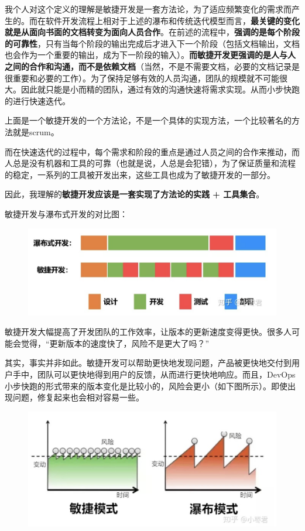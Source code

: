\documentclass[12pt]{article}
\begin{document}
我个人对这个定义的理解是敏捷开发是一套方法论，为了适应频繁变化的需求而产生的。而在软件开发流程上相对于上述的瀑布和传统迭代模型而言，\textbf{最关键的变化就是从面向书面的文档转变为面向人员合作}。在前述的流程中，\textbf{强调的是每个阶段的可靠性}，只有当每个阶段的输出完成后才进入下一个阶段（包括文档输出，文档也会作为一个重要的输出，成为下一阶段的输入）。\textbf{而敏捷开发更强调的是人与人之间的合作和沟通，而不是依赖文档}（当然，不是不需要文档，必要的文档记录是很重要和必要的工作）。为了保持足够有效的人员沟通，团队的规模就不可能很大。因此就只能是小而精的团队，通过有效的沟通快速将需求实现。从而小步快跑的进行快速迭代。

上面是一个敏捷开发的一个方法论，不是一个具体的实现方法，一个比较著名的方法就是scrum。

而在快速迭代的过程中，每个需求和阶段的重点是通过人员之间的合作来推动，而人总是没有机器和工具的可靠（也就是说，人总是会犯错），为了保证质量和流程的稳定，一系列的工具被开发出来，这些工具也成为了敏捷开发的一部分。

因此，我理解的\textbf{敏捷开发应该是一套实现了方法论的实践 + 工具集合}。

敏捷开发与瀑布式开发的对比图：
\begin{figure}[H]
    \centering
    \includegraphics[width=.6\textwidth]{fig/DevOps_Agile_vs_Waterfall_1.png}
\end{figure}

敏捷开发大幅提高了开发团队的工作效率，让版本的更新速度变得更快。很多人可能会觉得，“更新版本的速度快了，风险不是更大了吗？”

其实，事实并非如此。敏捷开发可以帮助更快地发现问题，产品被更快地交付到用户手中，团队可以更快地得到用户的反馈，从而进行更快地响应。而且，DevOps小步快跑的形式带来的版本变化是比较小的，风险会更小（如下图所示）。即使出现问题，修复起来也会相对容易一些。
\begin{figure}[H]
    \centering
    \includegraphics[width=.6\textwidth]{fig/DevOps_Agile_vs_Waterfall_2.png}
\end{figure}
\end{document}
